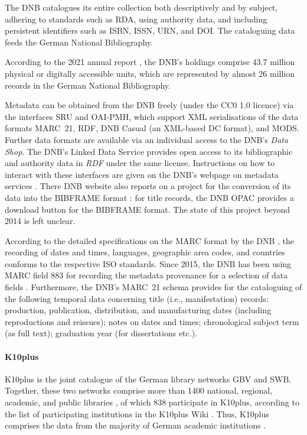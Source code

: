 The DNB catalogues its entire collection both descriptively and by subject, 
adhering to standards such as \gls{RDA}, using authority data, and including persistent identifiers such as ISBN, ISSN, URN, and DOI.
The cataloguing data feeds the German National Bibliography.

According to the 2021 annual report \autocite{DNB_Jahresbericht_2021},
the DNB's holdings comprise 43.7 million physical or digitally accessible units, 
which are represented by almost 26 million records in the German National Bibliography.

Metadata can be obtained from the DNB freely (under the CC0 1.0 licence) via the interfaces
\gls{SRU} and \gls{OAI-PMH}, which support \gls{XML} serialisations of the data formats
\gls{MARC}~21, \gls{RDF}, DNB Casual (an \gls{XML}-based \gls{DC} format), and \gls{MODS}.
Further data formats are available via an individual access
to the DNB's \emph{Data Shop}.
The DNB's Linked Data Service provides open access to its bibliographic and authority data
in \emph{RDF} under the same license. Instructions on how to interact with these interfaces
are given on the DNB's webpage on metadata services \autocite{DNB_metadata}.
There DNB website also reports on a project for the conversion of its data
into the \gls{BIBFRAME} format \autocite[cf.][]{DNBBIBFRAME}:
for title records, the DNB OPAC provides a download button for the BIBFRAME format.
The state of this project beyond 2014 is left unclear.

According to the detailed specifications on the \gls{MARC} format by the DNB
\autocite{DNB_MARC21,DNB_MARCXML}, the recording of dates and times, languages,
geographic area codes, and countries conforms to the respective \gls{ISO} standards.
Since 2015, the DNB has been using \gls{MARC} field 883
for recording the metadata provenance for a selection of data fields
\autocite{DNBwiki_MARC_883}.
Furthermore, the DNB's MARC~21 schema provides for the cataloguing of the following temporal data concerning
title (i.e., manifestation) records: production, publication, distribution, and manufacturing dates
(including reproductions and reissues); notes on dates and times;
chronological subject term (as full text); graduation year (for dissertations etc.).

\paragraph{K10plus}

%
%
\gls{K10plus} is the joint catalogue of the German library networks \gls{GBV} and \gls{SWB}.
Together, these two networks comprise more than 1400 national, regional,
academic, and public libraries \autocite{BSZGBV,GBV_VZG},
of which 838 participate in K10plus, according to the list of participating institutions
in the K10plus Wiki \autocite{K10plusWiki}. Thus, K10plus comprises the data from
the majority of German academic institutions \autocite[cf.][]{BSZ_K10plus}.

